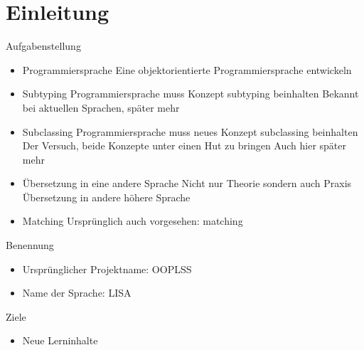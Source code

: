 \section{Einleitung}

\begin{frame}[t]{Aufgabenstellung}
	\begin{itemize}[<+->]
	\item Programmiersprache
	 {Eine objektorientierte Programmiersprache entwickeln}

	\item Subtyping
	 {Programmiersprache muss Konzept subtyping beinhalten}
	 {Bekannt bei aktuellen Sprachen, später mehr}

	\item Subclassing
	 {Programmiersprache muss neues Konzept subclassing beinhalten}
	 {Der Versuch, beide Konzepte unter einen Hut zu bringen}
	 {Auch hier später mehr}

	\item Übersetzung in eine andere Sprache
	 {Nicht nur Theorie sondern auch Praxis}
	 {Übersetzung in andere höhere Sprache}

	\item Matching
	 {Ursprünglich auch vorgesehen: matching}

	\end{itemize}

\end{frame}

\begin{frame}[t]{Benennung}
	\begin{itemize}[<+->]
		\item Ursprünglicher Projektname: OOPLSS

		\item Name der Sprache: LISA 

	\end{itemize}


\end{frame}

\begin{frame}[t]{Ziele}

	\begin{itemize}[<+->]
		\item Neue Lerninhalte
	\end{itemize}

\end{frame}
